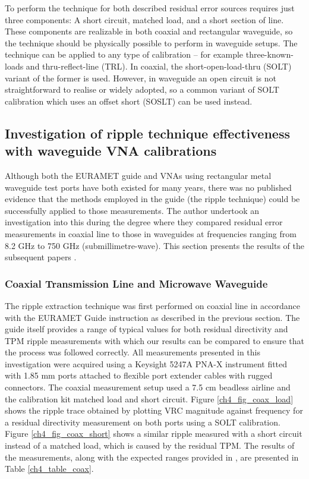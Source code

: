 \documentclass[../thesis/thesis.tex]{subfiles}
\begin{document}
\begin{refsection}
To perform the technique for both described residual error sources requires just three components: A short circuit, matched load, and a short section of line. These components are realizable in both coaxial and rectangular waveguide, so the technique should be physically possible to perform in waveguide setups. The technique can be applied to any type of calibration – for example three-known-loads and thru-reflect-line (TRL). In coaxial, the short-open-load-thru (SOLT) variant of the former is used. However, in waveguide an open circuit is not straightforward to realise or widely adopted, so a common variant of SOLT calibration which uses an offset short (SOSLT) can be used instead.

\subsection{Investigation of ripple technique effectiveness with waveguide VNA calibrations}

Although both the EURAMET guide and VNAs using rectangular metal waveguide test ports have both existed for many years, there was no published evidence that the methods employed in the guide (the ripple technique) could be successfully applied to those measurements. The author undertook an investigation into this during the degree where they compared residual error measurements in coaxial line to those in waveguides at frequencies ranging from 8.2 GHz to 750 GHz (submillimetre-wave). This section presents the results of the subsequent papers \cite{Stant_2016_Coll, Stant_2017}.

\subsubsection{Coaxial Transmission Line and Microwave Waveguide}

The ripple extraction technique was first performed on coaxial line in accordance with the EURAMET Guide \cite{EURAMET_2011} instruction as described in the previous section. The guide itself provides a range of typical values for both residual directivity and TPM ripple measurements with which our results can be compared to ensure that the process was followed correctly. All measurements presented in this investigation were acquired using a Keysight 5247A PNA-X instrument fitted with 1.85 mm ports attached to flexible port extender cables with rugged connectors. The coaxial measurement setup used a 7.5 cm beadless airline and the calibration kit matched load and short circuit. Figure \ref{ch4_fig_coax_load} shows the ripple trace obtained by plotting VRC magnitude against frequency for a residual directivity measurement on both ports using a SOLT calibration. Figure \ref{ch4_fig_coax_short} shows a similar ripple measured with a short circuit instead of a matched load, which is caused by the residual TPM. The results of the measurements, along with the expected ranges provided in \cite{EURAMET_2011}, are presented in Table \ref{ch4_table_coax}.


\end{refsection}
\end{document}
